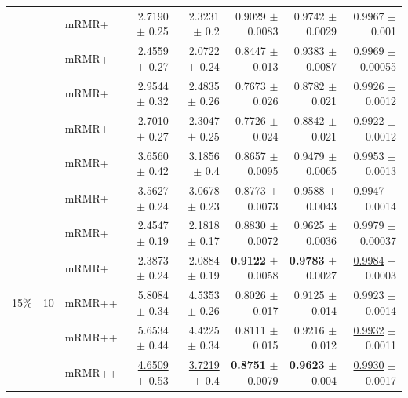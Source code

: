 \begin{longtable}{llp{}rrrrr}
 &  & mRMR+ & 2.7190 {\scriptsize $\pm$ 0.25} & 2.3231 {\scriptsize $\pm$ 0.2} & 0.9029 {\scriptsize $\pm$ 0.0083} & 0.9742 {\scriptsize $\pm$ 0.0029} & 0.9967 {\scriptsize $\pm$ 0.001} \\
 &  & mRMR+ & 2.4559 {\scriptsize $\pm$ 0.27} & 2.0722 {\scriptsize $\pm$ 0.24} & 0.8447 {\scriptsize $\pm$ 0.013} & 0.9383 {\scriptsize $\pm$ 0.0087} & 0.9969 {\scriptsize $\pm$ 0.00055} \\
 &  & mRMR+ & 2.9544 {\scriptsize $\pm$ 0.32} & 2.4835 {\scriptsize $\pm$ 0.26} & 0.7673 {\scriptsize $\pm$ 0.026} & 0.8782 {\scriptsize $\pm$ 0.021} & 0.9926 {\scriptsize $\pm$ 0.0012} \\
 &  & mRMR+ & 2.7010 {\scriptsize $\pm$ 0.27} & 2.3047 {\scriptsize $\pm$ 0.25} & 0.7726 {\scriptsize $\pm$ 0.024} & 0.8842 {\scriptsize $\pm$ 0.021} & 0.9922 {\scriptsize $\pm$ 0.0012} \\
 &  & mRMR+ & 3.6560 {\scriptsize $\pm$ 0.42} & 3.1856 {\scriptsize $\pm$ 0.4} & 0.8657 {\scriptsize $\pm$ 0.0095} & 0.9479 {\scriptsize $\pm$ 0.0065} & 0.9953 {\scriptsize $\pm$ 0.0013} \\
 &  & mRMR+ & 3.5627 {\scriptsize $\pm$ 0.24} & 3.0678 {\scriptsize $\pm$ 0.23} & 0.8773 {\scriptsize $\pm$ 0.0073} & 0.9588 {\scriptsize $\pm$ 0.0043} & 0.9947 {\scriptsize $\pm$ 0.0014} \\
 &  & mRMR+ & 2.4547 {\scriptsize $\pm$ 0.19} & 2.1818 {\scriptsize $\pm$ 0.17} & 0.8830 {\scriptsize $\pm$ 0.0072} & 0.9625 {\scriptsize $\pm$ 0.0036} & 0.9979 {\scriptsize $\pm$ 0.00037} \\
 &  & mRMR+ & 2.3873 {\scriptsize $\pm$ 0.24} & 2.0884 {\scriptsize $\pm$ 0.19} & \textbf{0.9122} {\scriptsize $\pm$ 0.0058} & \textbf{0.9783} {\scriptsize $\pm$ 0.0027} & \underline{0.9984} {\scriptsize $\pm$ 0.0003} \\
\midrule
15\% & 10 & mRMR++ & 5.8084 {\scriptsize $\pm$ 0.34} & 4.5353 {\scriptsize $\pm$ 0.26} & 0.8026 {\scriptsize $\pm$ 0.017} & 0.9125 {\scriptsize $\pm$ 0.014} & 0.9923 {\scriptsize $\pm$ 0.0014} \\
 &  & mRMR++ & 5.6534 {\scriptsize $\pm$ 0.44} & 4.4225 {\scriptsize $\pm$ 0.34} & 0.8111 {\scriptsize $\pm$ 0.015} & 0.9216 {\scriptsize $\pm$ 0.012} & \underline{0.9932} {\scriptsize $\pm$ 0.0011} \\
 &  & mRMR++ & \underline{4.6509} {\scriptsize $\pm$ 0.53} & \underline{3.7219} {\scriptsize $\pm$ 0.4} & \textbf{0.8751} {\scriptsize $\pm$ 0.0079} & \textbf{0.9623} {\scriptsize $\pm$ 0.004} & \underline{0.9930} {\scriptsize $\pm$ 0.0017} \\

\end{longtable}
